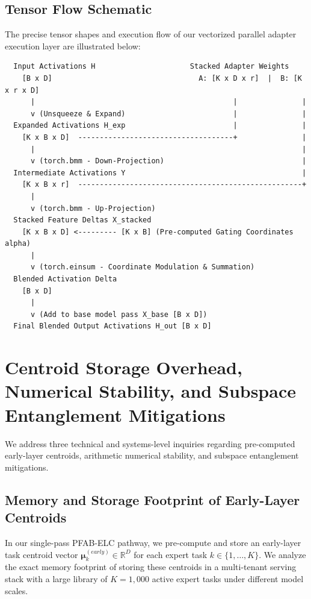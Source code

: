 \documentclass{article}
\theoremstyle{plain}
\theoremstyle{definition}
\theoremstyle{remark}
\begin{document}
\subsection{Tensor Flow Schematic}
The precise tensor shapes and execution flow of our vectorized parallel adapter execution layer are illustrated below:

\begin{verbatim}
  Input Activations H                      Stacked Adapter Weights
    [B x D]                                  A: [K x D x r]  |  B: [K x r x D]
      |                                              |               |
      v (Unsqueeze & Expand)                         |               |
  Expanded Activations H_exp                         |               |
    [K x B x D]  ------------------------------------+               |
      |                                                              |
      v (torch.bmm - Down-Projection)                                |
  Intermediate Activations Y                                         |
    [K x B x r]  ----------------------------------------------------+
      |
      v (torch.bmm - Up-Projection)
  Stacked Feature Deltas X_stacked
    [K x B x D] <--------- [K x B] (Pre-computed Gating Coordinates alpha)
      |
      v (torch.einsum - Coordinate Modulation & Summation)
  Blended Activation Delta
    [B x D]
      |
      v (Add to base model pass X_base [B x D])
  Final Blended Output Activations H_out [B x D]
\end{verbatim}

\section{Centroid Storage Overhead, Numerical Stability, and Subspace Entanglement Mitigations}
\label{app:rigor}

We address three technical and systems-level inquiries regarding pre-computed early-layer centroids, arithmetic numerical stability, and subspace entanglement mitigations.

\subsection{Memory and Storage Footprint of Early-Layer Centroids}
In our single-pass \textsc{PFAB-ELC} pathway, we pre-compute and store an early-layer task centroid vector $\boldsymbol{\mu}_k^{(early)} \in \mathbb{R}^D$ for each expert task $k \in \{1, \dots, K\}$. We analyze the exact memory footprint of storing these centroids in a multi-tenant serving stack with a large library of $K = 1,000$ active expert tasks under different model scales.
\end{document}
